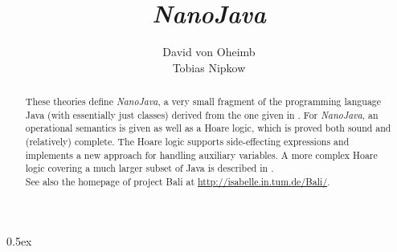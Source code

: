 \documentclass[11pt,a4paper]{article}
\newcommand{\nJava}{\it NanoJava}
\begin{document}
\title{\nJava}
\author{David von Oheimb \\ Tobias Nipkow}
\maketitle

\begin{abstract}\noindent
  These theories define {\nJava}, a very small fragment of the programming 
  language Java (with essentially just classes) derived from the one given 
  in \cite{NipkowOP00}.
  For {\nJava}, an operational semantics is given as well as a Hoare logic,
  which is proved both sound and (relatively) complete. 
  The Hoare logic supports side-effecting expressions and
  implements a new approach for handling auxiliary variables.
  A more complex Hoare logic covering a much larger subset of Java is described
  in \cite{DvO-CPE01}.\\
See also the homepage of project Bali at \url{http://isabelle.in.tum.de/Bali/}.
\end{abstract}

\tableofcontents
\parindent 0pt \parskip 0.5ex

\newpage


\newpage
\nocite{*}


\end{document}
